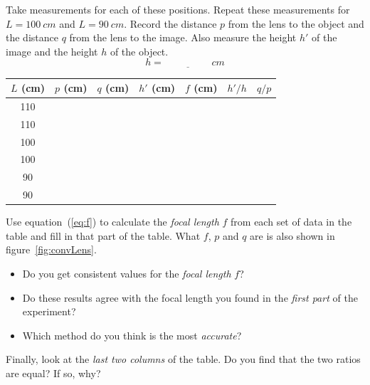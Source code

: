 \documentclass[11pt, a4paper]{article}
\begin{document}
Take measurements for each of these positions.
Repeat these measurements for $L = 100~\si{cm}$ and $L = 90~\si{cm}$.
Record the distance $p$ from the lens to the object and the distance
$q$ from the lens to the image.
Also measure the height $h'$ of the image and the height $h$
of the object.
\begin{equation*}
    h = \underline{\hspace{2cm}}\si{cm}
\end{equation*}

\begin{center}
    \def\arraystretch{1.5}
    \setlength\tabcolsep{0.6cm}
    \begin{tabular}{|c|c|c|c|c|c|c|}
        \hline
        \rowcolor{gray!40}
        $L$ (cm) & $p$ (cm) & $q$ (cm) & $h'$ (cm) & $f$ (cm) & $h'/h$ & $q/p$ \\
        \hline
        110 & ~ & ~ & ~ & ~ & ~ & ~ \\
        \hline
        110 & ~ & ~ & ~ & ~ & ~ & ~ \\
        \hline
        100 & ~ & ~ & ~ & ~ & ~ & ~ \\
        \hline
        100 & ~ & ~ & ~ & ~ & ~ & ~ \\
        \hline
        90 & ~ & ~ & ~ & ~ & ~ & ~ \\
        \hline
        90 & ~ & ~ & ~ & ~ & ~ & ~ \\
        \hline
    \end{tabular}
\end{center}

Use equation~(\ref{eq:f}) to calculate the \textit{focal length} $f$ from each set of data in the table
and fill in that part of the table.
What $f$, $p$ and $q$ are is also shown in figure~\ref{fig:convLens}.
\begin{itemize}
    \item Do you get consistent values for the \textit{focal length} $f$?
    \item Do these results agree with the focal length you found in the \textit{first part} of the experiment?
    \item Which method do you think is the most \textit{accurate}?
\end{itemize}
\fillwithlines{3cm}
Finally, look at the \textit{last two columns} of the table.
Do you find that the two ratios are equal?
If so, why?
\fillwithlines{3cm}
\end{document}
